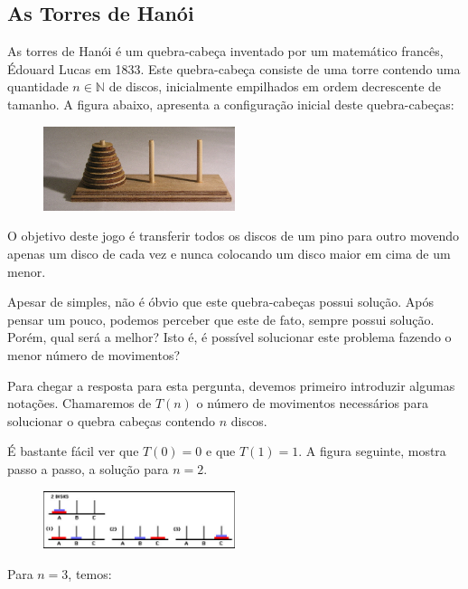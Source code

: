 \subsection{As Torres de Hanói}

As torres de Hanói é um quebra-cabeça inventado por um matemático
francês, Édouard Lucas em 1833.  Este quebra-cabeça consiste de uma
torre contendo uma quantidade $n\in\mathbb{N}$ de discos, inicialmente
empilhados em ordem decrescente de tamanho. A figura abaixo, apresenta
a configuração inicial deste quebra-cabeças:

\begin{figure}[h!]
  \centering
      \includegraphics[width=0.5\textwidth]{imagens/torredehanoi.jpg}
 \end{figure}
O objetivo deste jogo é transferir todos os discos de um pino para
outro movendo apenas um disco de cada vez e nunca colocando um disco
maior em cima de um menor.

Apesar de simples, não é óbvio que este quebra-cabeças possui
solução. Após pensar um pouco, podemos perceber que este de fato,
sempre possui solução. Porém, qual será a melhor? Isto é, é possível
solucionar este problema fazendo o menor número de movimentos?

Para chegar a resposta para esta pergunta, devemos primeiro introduzir
algumas notações. Chamaremos de $T(n)$ o número de movimentos
necessários para solucionar o quebra cabeças contendo $n$ discos.

É bastante fácil ver que $T(0) = 0$ e que $T(1) = 1$. A figura
seguinte, mostra passo a passo, a solução para $n = 2$.\\

\begin{figure}[H]
  \centering
      \includegraphics[width=0.5\textwidth]{imagens/hanoi2.jpg}
 \end{figure}

Para $n = 3$, temos: \\

